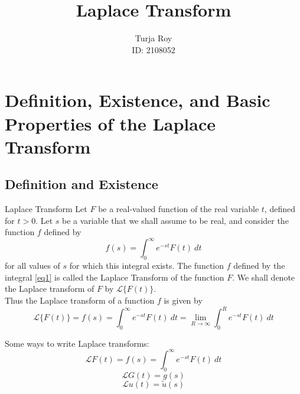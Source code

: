 \documentclass[12pt]{article}
\title{
    \textbf{Laplace Transform}
}
\author{
    Turja Roy\\
    ID: 2108052
}
\date{}
\newcommand{\Lap}{\mathscr{L}}
\begin{document}
\maketitle
\tableofcontents
\newpage


\section{Definition, Existence, and Basic Properties of the Laplace Transform}


\subsection{Definition and Existence}

\begin{definition}{Laplace Transform}{}
    Let $F$ be a real-valued function of the real variable $t$, defined for $t>0$. Let $s$ be a variable that we shall assume to be real, and consider the function $f$ defined by
    \begin{equation} \label{eq1}
        f(s) = \int_{0}^{\infty} {e^{-st} F(t)} \: d{t} 
    \end{equation}
    for all values of $s$ for which this integral exists. The function $f$ defined by the integral \eqref{eq1} is called the Laplace Transform of the function $F$. We shall denote the Laplace transform of $F$ by $\Lap\{F(t)\}$.\\
    Thus the Laplace transform of a function $f$ is given by
    \begin{equation} \label{eq2}
        \Lap\{ F(t) \} = f(s) = \int_{0}^{\infty} {e^{-st} F(t)} \: d{t}  = \lim_{R \to \infty} \int_{0}^{R} {e^{-st} F(t)} \: d{t} 
    \end{equation}
\end{definition}

Some ways to write Laplace transforms:\\
\[ \Lap{F(t)} = f(s) = \int_{0}^{\infty} { e^{-st} F(t) } \: d{t} \]
\[ \Lap{G(t)} = g(s) \]
\[ \Lap{u(t)} = \tilde{u}(s) \]
\end{document}
